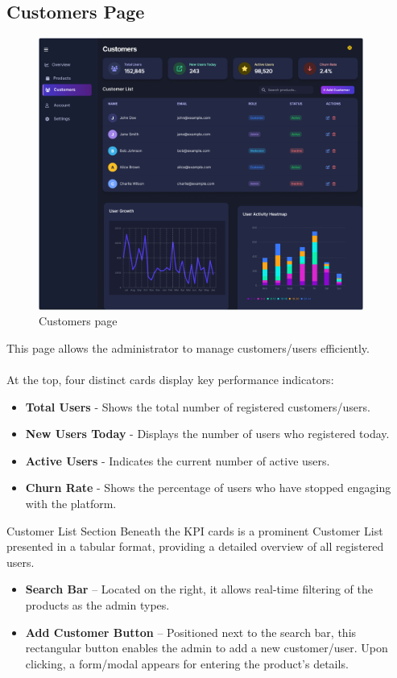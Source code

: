 \documentclass[12pt]{article}
\begin{document}
	
	\subsection{Customers Page}\label{subsec:customers-page}
	\begin{figure}[h]
		\centering
		\includegraphics[width=0.95\textwidth]{pictures/admin/Customers_Admin}
		\caption{Customers page}\label{fig:figure3}
	\end{figure}
	This page allows the administrator to manage customers/users efficiently. \\ \\
	At the top, four distinct cards display key performance indicators:
	\begin{itemize}
		\item \textbf{Total Users} - Shows the total number of registered customers/users.
		\item \textbf{New Users Today} - Displays the number of users who registered today.
		\item \textbf{Active Users} - Indicates the current number of active users.
		\item \textbf{Churn Rate} - Shows the percentage of users who have stopped engaging with the platform.
	\end{itemize}
	Customer List Section
	Beneath the KPI cards is a prominent Customer List presented in a tabular format, providing a detailed overview of all registered users.
	\begin{itemize}
		\item \textbf{Search Bar} – Located on the right, it allows real-time filtering of the products as the admin types.
		\item \textbf{Add Customer Button} – Positioned next to the search bar, this rectangular button enables the admin to add a new customer/user. Upon clicking, a form/modal appears for entering the product’s details.
	\end{itemize}
\end{document}
